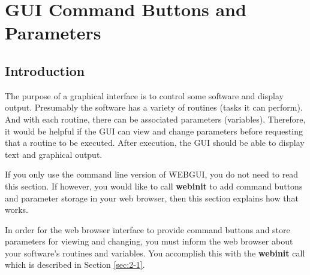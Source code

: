 \cleardoublepage
\setcounter{chapter}{2} %
\setcounter{section}{3} %
\chapter{GUI Command Buttons and Parameters}
\setcounter{page}{33} %

 
\section{Introduction}
\label{sec:3-2}
The purpose of a graphical interface is to control some software and display output. Presumably the software 
has a variety of routines (tasks it can perform). And with each routine, there can be associated parameters 
(variables). Therefore, it would be helpful if the GUI can view and change parameters before requesting that a 
routine to be executed. After execution, the GUI should be able to display text and graphical output.

If you only use the command line version of \f{WEBGUI}, you do not need to read this section. If however, you
would like to call \textbf{webinit} to add command buttons and parameter storage in your web browser, then
this section explains how that works.

In order for the web browser interface to provide command buttons and store parameters for viewing and changing,
you must inform the web browser about your software's routines and variables. You accomplish this with the 
\textbf{webinit} call which is described in Section \ref{sec:2-1}.

